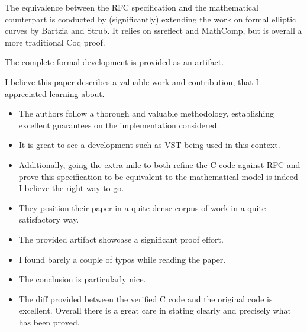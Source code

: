 The equivalence between the RFC specification and the mathematical counterpart
is conducted by (significantly) extending the work on formal elliptic curves by
Bartzia and Strub. It relies on ssreflect and MathComp, but is overall a more
traditional Coq proof.

The complete formal development is provided as an artifact.

\begin{center}
\end{center}
I believe this paper describes a valuable work and contribution, that I appreciated learning about.
\begin{itemize}
    \item The authors follow a thorough and valuable methodology, establishing excellent guarantees on the implementation considered.
    \item It is great to see a development such as VST being used in this context.
    \item Additionally, going the extra-mile to both refine the C code against RFC and prove this specification to be equivalent to the mathematical model is indeed I believe the right way to go.
    \item They position their paper in a quite dense corpus of work in a quite satisfactory way.
    \item The provided artifact showcase a significant proof effort.
    \item I found barely a couple of typos while reading the paper.
    \item The conclusion is particularly nice.
    \item The diff provided between the verified C code and the original code is excellent. Overall there is a great care in stating clearly and precisely what has been proved.
\end{itemize}

\begin{center}
\end{center}

